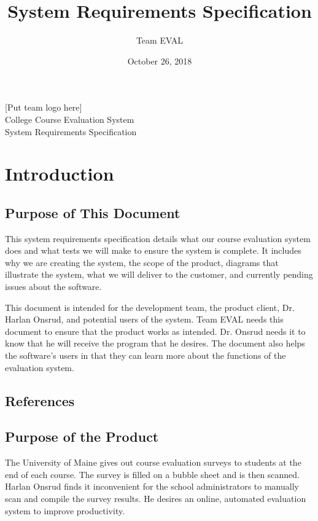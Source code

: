 \documentclass{article}
\title{System Requirements Specification}
\author{Team EVAL}
\date{October 26, 2018}
\begin{document}
\maketitle

\newpage

\begin{center}
[Put team logo here]\\ \bigskip
{\LARGE College Course Evaluation System }\\ \medskip
{\large System Requirements Specification }\\
\end{center}

\tableofcontents

\newpage

\section{Introduction}
\subsection{Purpose of This Document}

This system requirements specification details what our course evaluation system does and what tests we will make to ensure the system is complete. It includes why we are creating the system, the scope of the product, diagrams that illustrate the system, what we will deliver to the customer, and currently pending issues about the software.

This document is intended for the development team, the product client, Dr. Harlan Onsrud, and potential users of the system. Team EVAL needs this document to ensure that the product works as intended. Dr. Onsrud needs it to know that he will receive the program that he desires. The document also helps the software's users in that they can learn more about the functions of the evaluation system.

\subsection{References}
\subsection{Purpose of the Product}

The University of Maine gives out course evaluation surveys to students at the end of each course. The survey is filled on a bubble sheet and is then scanned. Harlan Onsrud finds it inconvenient for the school administrators to manually scan and compile the survey results. He desires an online, automated evaluation system to improve productivity.\par
\end{document}
